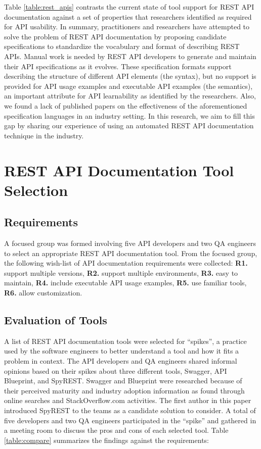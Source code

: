 \documentclass[10pt, conference]{IEEEtran}
\begin{document}
Table \ref{table:rest_apis} contrasts the current state of tool support for REST API documentation against a set of properties that researchers identified as required for API usability. In summary, practitioners and researchers have attempted to solve the problem of REST API documentation by proposing candidate specifications to standardize the vocabulary and format of describing REST APIs. Manual work is needed by REST API developers to generate and maintain their API specifications as it evolves. These specification formats support describing the structure of different API elements (the syntax), but no support is provided for API usage examples and executable API examples (the semantics), an important attribute for API learnability as identified by the researchers. Also, we found a lack of published papers on the effectiveness of the aforementioned specification languages in an industry setting. In this research, we aim to fill this gap by sharing our experience of using an automated REST API documentation technique in the industry.

\section{REST API Documentation Tool Selection}

\subsection{Requirements}

A focused group was formed involving five API developers and two QA engineers to select an appropriate REST API documentation tool. From the focused group, the following wish-list of API documentation requirements were collected: \textbf{R1.} support multiple versions, \textbf{R2.} support multiple environments, \textbf{R3.} easy to maintain, \textbf{R4.} include executable API usage examples, \textbf{R5.} use familiar tools, \textbf{R6.} allow customization.

\subsection{Evaluation of Tools}
A list of REST API documentation tools were selected for ``spikes'', a practice used by the software engineers to better understand a tool and how it fits a problem in context. The API developers and QA engineers shared informal opinions based on their spikes about three different tools, Swagger, API Blueprint, and SpyREST. Swagger and Blueprint were researched because of their perceived maturity and industry adoption information as found through online searches and StackOverflow.com activities. The first author in this paper introduced SpyREST to the teams as a candidate solution to consider. A total of five developers and two QA engineers participated in the ``spike'' and gathered in a meeting room to discuss the pros and cons of each selected tool. Table \ref{table:compare} summarizes the findings against the requirements:
\end{document}
